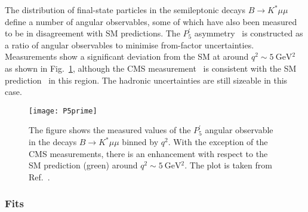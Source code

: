 The distribution of final-state particles in the semileptonic decays
$B \to K^{*} \mu \mu$ define a number of angular observables, some of which have
also been measured to be in disagreement with SM predictions. The
$P_{5}^{\prime}$ asymmetry~\cite{Ali:1991is, Egede:2008uy,
  Descotes-Genon:2013vna} is constructed as a ratio of angular observables to
minimise from-factor uncertainties. Measurements show a significant deviation
from the SM at around $q^{2} \sim \SI{5}{\GeV^{2}}$~\cite{Aaij:2013qta,
  Aaij:2020nrf, Wehle:2016yoi, Aaboud:2018krd} as shown in
Fig.~\ref{fig:ch1-p5p-exp}, although the CMS measurement~\cite{Sirunyan:2017dhj} is
consistent with the SM prediction~\cite{Straub:2015ica, Altmannshofer:2014rta,
  Descotes-Genon:2014uoa, Khodjamirian:2010vf} in this region. The hadronic
uncertainties are still sizeable in this case.

\begin{figure}[t]
  \centering
  \texttt{[image: P5prime]}
  \caption[The figure shows the measured values of the $P_{5}^{\prime}$ angular
  observable in the decays $B \to K^{*} \mu\mu$ binned by $q^{2}$.]{The figure
    shows the measured values of the $P_{5}^{\prime}$ angular observable in the
    decays $B \to K^{*} \mu\mu$ binned by $q^{2}$. With the exception of the CMS
    measurements, there is an enhancement with respect to the SM prediction
    (green) around $q^{2} \sim \SI{5}{\GeV^{2}}$. The plot is taken from
    Ref.~\cite{Koppenburg:2016rji}.}
  \label{fig:ch1-p5p-exp}
\end{figure}

\subsubsection{Fits}

